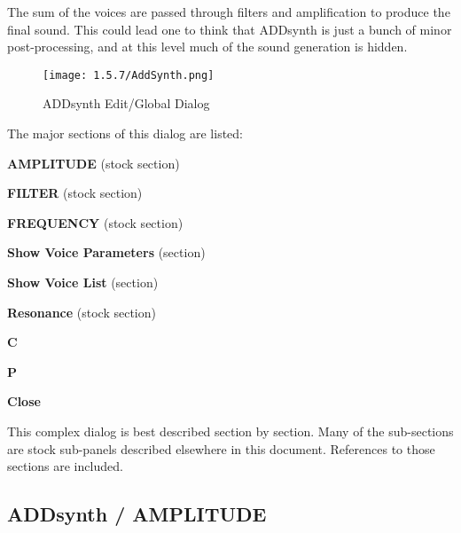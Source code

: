    The sum of the voices are passed through filters and amplification to
   produce the final sound. This could lead one to think that ADDsynth is just
   a bunch of minor post-processing, and at this level much of the sound
   generation is hidden.

\begin{figure}[H]
   \centering
   \texttt{[image: 1.5.7/AddSynth.png]}
   \caption{ADDsynth Edit/Global Dialog}
   \label{fig:addsynth_edit_dialog}
\end{figure}

   The major sections of this dialog are listed:

   \begin{enumber}
      \item \textbf{AMPLITUDE} (stock section)
      \item \textbf{FILTER} (stock section)
      \item \textbf{FREQUENCY} (stock section)
      \item \textbf{Show Voice Parameters} (section)
      \item \textbf{Show Voice List} (section)
      \item \textbf{Resonance} (stock section)
      \item \textbf{C}
      \item \textbf{P}
      \item \textbf{Close}
   \end{enumber}

   This complex dialog is best described section by section.
   Many of the sub-sections are stock sub-panels described elsewhere
   in this document.  References to those sections are included.

\subsection{ADDsynth / AMPLITUDE}
\label{subsec:addsynth_amplitude}

